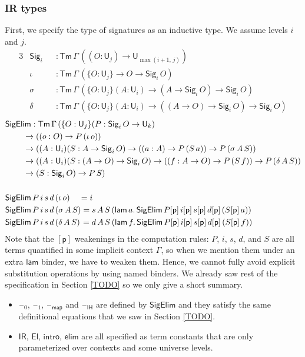 \documentclass[acmsmall,screen,review,anonymous]{acmart}
\newcommand{\msf}[1]{{\mathsf{#1}}}
\newcommand{\p}{\mathsf{p}}
\newcommand{\U}{\msf{U}}
\newcommand{\El}{\msf{El}}
\newcommand{\Sig}{\msf{Sig}}
\newcommand{\blank}{{\mathord{\hspace{1pt}\text{--}\hspace{1pt}}}}
\newcommand{\IR}{\msf{IR}}
\newcommand{\intro}{\msf{intro}}
\newcommand{\IH}{\msf{IH}}
\newcommand{\map}{\msf{map}}
\newcommand{\elim}{\msf{elim}}
\newcommand{\Tm}{\msf{Tm}}
\newcommand{\lam}{\msf{lam}}
\newcommand{\SigElim}{\msf{SigElim}}
\begin{document}
\subsubsection{IR types} First, we specify the type of signatures as an inductive type. We assume levels $i$
and $j$.
\begin{alignat*}{3}
  &\Sig_i  &&: \Tm\,\Gamma\,((O : \U_j) \to \U_{\max(i+1,\,j)})\\
  &\iota   &&: \Tm\,\Gamma\,(\{O : \U_j\} \to O \to \Sig_i\,O)\\
  &\sigma  &&: \Tm\,\Gamma\,(\{O : \U_j\}(A : \U_i) \to (A \to \Sig_i\,O) \to \Sig_i\,O)\\
  &\delta  &&: \Tm\,\Gamma\,(\{O : \U_j\}(A : \U_i) \to ((A \to O) \to \Sig_i\,O) \to \Sig_i\,O)
\end{alignat*}
\begin{alignat*}{3}
  &\SigElim : \Tm\,\Gamma\,(\{O : \U_j\}(P : \Sig_i\,O \to \U_k)\\
  &           \hspace{2.2em}\to ((o : O) \to P\,(\iota\,o))\\
  &           \hspace{2.2em}\to ((A : \U_i)(S : A \to \Sig_i\,O) \to ((a : A) \to P\,(S\,a)) \to P\,(\sigma\,A\,S))\\
  &           \hspace{2.2em}\to ((A : \U_i)(S : (A \to O) \to \Sig_i\,O) \to ((f : A \to O) \to P\,(S\,f)) \to P\,(\delta\,A\,S))\\
  &           \hspace{2.2em}\to (S : \Sig_i\,O) \to P\,S)\\
  &\\
  &\SigElim\,P\,i\,s\,d\,(\iota\,o) \hspace{1.1em} = i\\
  &\SigElim\,P\,i\,s\,d\,(\sigma\,A\,S) = s\,A\,S\,(\lam\,a.\,\SigElim\,P[\p]\,i[\p]\,s[\p]\,d[\p]\,(S[\p]\,a))\\
  &\SigElim\,P\,i\,s\,d\,(\delta\,A\,S) \hspace{0.1em}= d\,A\,S\,(\lam\,f.\,\SigElim\,P[\p]\,i[\p]\,s[\p]\,d[\p]\,(S[\p]\,f))
\end{alignat*}
Note that the $[\p]$ weakenings in the computation rules: $P$, $i$, $s$, $d$, and $S$ are all terms
quantified in some implicit context $\Gamma$, so when we mention them under an extra $\lam$ binder,
we have to weaken them. Hence, we cannot fully avoid explicit substitution operations by using named
binders. We already saw rest of the specification in Section \ref{TODO} so we only give a short summary.
\begin{itemize}
\item $\blank_0$, $\blank_1$, $\blank_\map$ and $\blank_\IH$ are defined by $\SigElim$ and they satisfy the same definitional equations
  that we saw in Section \ref{TODO}.
\item $\IR$, $\El$, $\intro$, $\elim$ are all specified as term constants that are only parameterized over contexts and some universe levels.
\end{itemize}
\end{document}
